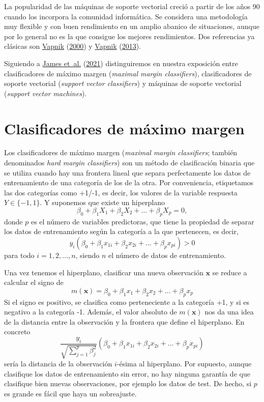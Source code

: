 \documentclass[
  spanish,
]{book}
\theoremstyle{break}
\theoremstyle{definition}
\theoremstyle{definition}
\theoremstyle{definition}
\theoremstyle{definition}
\theoremstyle{remark}
\begin{document}
La popularidad de las máquinas de soporte vectorial creció a partir de los años 90 cuando los incorpora la comunidad informática. Se considera una metodología muy flexible y con buen rendimiento en un amplio abanico de situaciones, aunque por lo general no es la que consigue los mejores rendimientos. Dos referencias ya clásicas son \protect\hyperlink{ref-vapnik1998}{Vapnik} (\protect\hyperlink{ref-vapnik1998}{2000}) y \protect\hyperlink{ref-vapnik2013nature}{Vapnik} (\protect\hyperlink{ref-vapnik2013nature}{2013}).

Siguiendo a \protect\hyperlink{ref-james2021introduction}{James et~al.} (\protect\hyperlink{ref-james2021introduction}{2021}) distinguiremos en nuestra exposición entre clasificadores de máximo margen (\emph{maximal margin classifiers}), clasificadores de soporte vectorial (\emph{support vector classifiers}) y máquinas de soporte vectorial (\emph{support vector machines}).

\hypertarget{clasificadores-de-muxe1ximo-margen}{%
\section{Clasificadores de máximo margen}\label{clasificadores-de-muxe1ximo-margen}}

Los clasificadores de máximo margen (\emph{maximal margin classifiers}; también denominados \emph{hard margin classifiers}) son un método de clasificación binaria que se utiliza cuando hay una frontera lineal que separa perfectamente los datos de entrenamiento de una categoría de los de la otra. Por conveniencia, etiquetamos las dos categorías como +1/-1, es decir, los valores de la variable respuesta \(Y \in \{-1, 1\}\). Y suponemos que existe un hiperplano
\[ \beta_0 + \beta_1 X_1 + \beta_2 X_2 + \ldots + \beta_p X_p = 0,\]
donde \(p\) es el número de variables predictoras, que tiene la propiedad de separar los datos de entrenamiento según la categoría a la que pertenecen, es decir,
\[ y_i(\beta_0 + \beta_1 x_{1i} + \beta_2 x_{2i} + \ldots + \beta_p x_{pi}) > 0\]
para todo \(i = 1, 2, \ldots, n\), siendo \(n\) el número de datos de entrenamiento.

Una vez tenemos el hiperplano, clasificar una nueva observación \(\mathbf{x}\) se reduce a calcular el signo de
\[m(\mathbf{x}) = \beta_0 + \beta_1 x_1 + \beta_2 x_2 + \ldots + \beta_p x_p\]
Si el signo es positivo, se clasifica como perteneciente a la categoría +1, y si es negativo a la categoría -1. Además, el valor absoluto de \(m(\mathbf{x})\) nos da una idea de la distancia entre la observación y la frontera que define el hiperplano. En concreto
\[\frac{y_i}{\sqrt {\sum_{j=1}^p \beta_j^2}}(\beta_0 + \beta_1 x_{1i} + \beta_2 x_{2i} + \ldots + \beta_p x_{pi})\]
sería la distancia de la observación \(i\)-ésima al hiperplano.
Por supuesto, aunque clasifique los datos de entrenamiento sin error, no hay ninguna garantía de que clasifique bien nuevas observaciones, por ejemplo los datos de test. De hecho, si \(p\) es grande es fácil que haya un sobreajuste.
\end{document}
